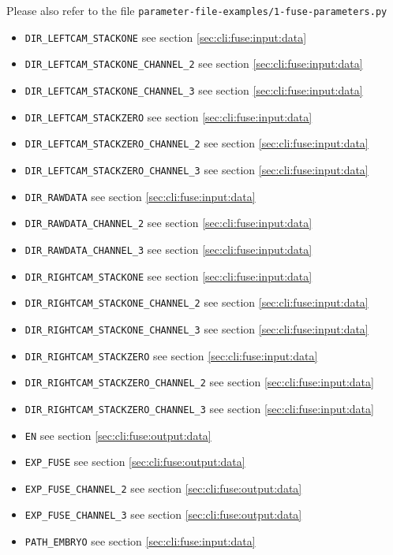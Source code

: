 Please also refer to the file
\texttt{parameter-file-examples/1-fuse-parameters.py}

\begin{itemize}
\itemsep -0.5ex
\item \texttt{DIR\_LEFTCAM\_STACKONE} see section \ref{sec:cli:fuse:input:data}
\item \texttt{DIR\_LEFTCAM\_STACKONE\_CHANNEL\_2} see section \ref{sec:cli:fuse:input:data}
\item \texttt{DIR\_LEFTCAM\_STACKONE\_CHANNEL\_3} see section \ref{sec:cli:fuse:input:data}
\item \texttt{DIR\_LEFTCAM\_STACKZERO} see section \ref{sec:cli:fuse:input:data}
\item \texttt{DIR\_LEFTCAM\_STACKZERO\_CHANNEL\_2} see section \ref{sec:cli:fuse:input:data}
\item \texttt{DIR\_LEFTCAM\_STACKZERO\_CHANNEL\_3} see section \ref{sec:cli:fuse:input:data}
\item \texttt{DIR\_RAWDATA} see section \ref{sec:cli:fuse:input:data}
\item \texttt{DIR\_RAWDATA\_CHANNEL\_2} see section \ref{sec:cli:fuse:input:data}
\item \texttt{DIR\_RAWDATA\_CHANNEL\_3} see section \ref{sec:cli:fuse:input:data}
\item \texttt{DIR\_RIGHTCAM\_STACKONE} see section \ref{sec:cli:fuse:input:data}
\item \texttt{DIR\_RIGHTCAM\_STACKONE\_CHANNEL\_2} see section \ref{sec:cli:fuse:input:data}
\item \texttt{DIR\_RIGHTCAM\_STACKONE\_CHANNEL\_3} see section \ref{sec:cli:fuse:input:data}
\item \texttt{DIR\_RIGHTCAM\_STACKZERO} see section \ref{sec:cli:fuse:input:data}
\item \texttt{DIR\_RIGHTCAM\_STACKZERO\_CHANNEL\_2} see section \ref{sec:cli:fuse:input:data}
\item \texttt{DIR\_RIGHTCAM\_STACKZERO\_CHANNEL\_3} see section \ref{sec:cli:fuse:input:data}
\item \texttt{EN} see section \ref{sec:cli:fuse:output:data}
\item \texttt{EXP\_FUSE} see section \ref{sec:cli:fuse:output:data}
\item \texttt{EXP\_FUSE\_CHANNEL\_2} see section \ref{sec:cli:fuse:output:data}
\item \texttt{EXP\_FUSE\_CHANNEL\_3} see section \ref{sec:cli:fuse:output:data}
\item \texttt{PATH\_EMBRYO} see section \ref{sec:cli:fuse:input:data}

\end{itemize}
